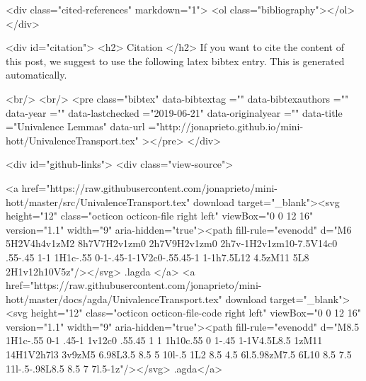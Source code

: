   <div class="cited-references" markdown="1">
  <ol class="bibliography"></ol>
  </div>


  
  <div id="citation">
  <h2> Citation </h2>
  If you want to cite the content of this post,
  we suggest to use the following latex bibtex entry.
  This is generated automatically.

  <br/>
  <br/>
  <pre class="bibtex"
       data-bibtextag =""
       data-bibtexauthors =""
       data-year =""
       data-lastchecked ="2019-06-21"
       data-originalyear =""
       data-title ="Univalence Lemmas"
       data-url ="http://jonaprieto.github.io/mini-hott/UnivalenceTransport.tex"
  ></pre>
  </div>
  

  <div id="github-links">
    <div class="view-source">
      
        <a href="https://raw.githubusercontent.com/jonaprieto/mini-hott/master/src/UnivalenceTransport.tex" download target="_blank"><svg height="12" class="octicon octicon-file right left" viewBox="0 0 12 16" version="1.1" width="9" aria-hidden="true"><path fill-rule="evenodd" d="M6 5H2V4h4v1zM2 8h7V7H2v1zm0 2h7V9H2v1zm0 2h7v-1H2v1zm10-7.5V14c0 .55-.45 1-1 1H1c-.55 0-1-.45-1-1V2c0-.55.45-1 1-1h7.5L12 4.5zM11 5L8 2H1v12h10V5z"/></svg> .lagda </a>
        <a href="https://raw.githubusercontent.com/jonaprieto/mini-hott/master/docs/agda/UnivalenceTransport.tex" download target="_blank"><svg height="12" class="octicon octicon-file-code right left" viewBox="0 0 12 16" version="1.1" width="9" aria-hidden="true"><path fill-rule="evenodd" d="M8.5 1H1c-.55 0-1 .45-1 1v12c0 .55.45 1 1 1h10c.55 0 1-.45 1-1V4.5L8.5 1zM11 14H1V2h7l3 3v9zM5 6.98L3.5 8.5 5 10l-.5 1L2 8.5 4.5 6l.5.98zM7.5 6L10 8.5 7.5 11l-.5-.98L8.5 8.5 7 7l.5-1z"/></svg> .agda</a>
      

